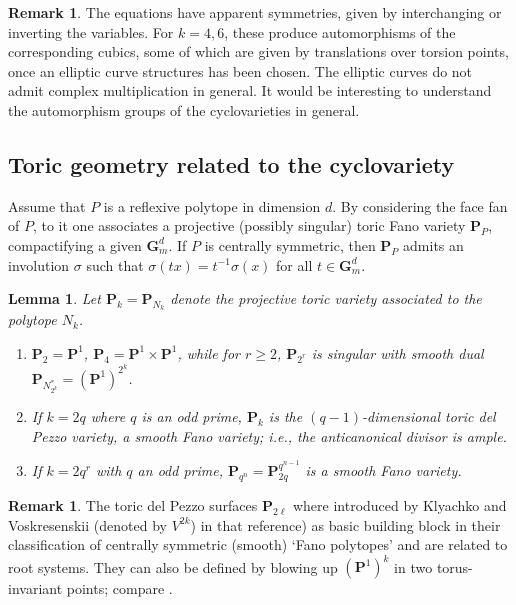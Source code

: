 \documentclass[12pt,reqno]{amsart}
\theoremstyle{definition}
\theoremstyle{plain}
\newtheorem{lemma}[theorem]{Lemma}
\theoremstyle{definition}
\newtheorem{remark}[theorem]{Remark}
\newcommand{\PP}{\mathbf{P}}
\newcommand{\Gm}{\mathbf{G}_m}
\renewcommand{\geq}{\geqslant}
\begin{document}
\begin{remark} The equations have apparent symmetries, given by interchanging or inverting the variables. For $k=4,6$, these produce automorphisms of the corresponding cubics, some of which are given by translations over torsion points, once an elliptic curve structures has been chosen. The elliptic curves do not admit complex multiplication in general. It would be interesting to understand the automorphism groups of the cyclovarieties in general. 
\end{remark}
 
\subsection{Toric geometry related to the cyclovariety} 

Assume that $P$ is a reflexive polytope in dimension $d$. By considering the face fan of $P$, to it one associates a projective (possibly singular) toric Fano variety $\PP_P$, compactifying a given $\Gm^d$. If $P$ is centrally symmetric, then $\PP_P$ admits an involution $\sigma$ such that $\sigma(tx)=t^{-1}\sigma(x)$ for all $t \in \Gm^d$. 

\begin{lemma} \label{dp} Let $\PP_k=\PP_{N_k}$ denote the projective toric variety associated to the polytope $N_k$. 
\begin{enumerate}
\item  \label{dp1} $\PP_2=\PP^1$, $\PP_4 = \PP^1 \times \PP^1$, while for $r \geq 2$, $\PP_{2^r}$ is singular with smooth dual $\PP_{N^*_{2^k}} = (\PP^1)^{2^k}$.
\item \label{dp2} If $k=2q$ where $q$ is an odd prime, $\PP_{k}$ is the $(q-1)$-dimensional \emph{toric del Pezzo variety}, a smooth Fano variety; i.e., the anticanonical divisor is ample. 
\item \label{dp3} If $k=2q^r$ with $q$ an odd prime, $\PP_{q^n} = \PP_{2q}^{q^{n-1}}$ is a smooth Fano variety. 
\end{enumerate}
\end{lemma} 

\begin{remark} 
The toric del Pezzo surfaces $\PP_{2\ell}$ where introduced by Klyachko and Voskresenskii \cite{KlyachkoVoskresenskii} (denoted by $V^{2k}$) in that reference) as basic building block in their classification of centrally symmetric (smooth) `Fano polytopes' and are related to root systems. They can also be defined by blowing up $(\PP^1)^k$ in two torus-invariant points; compare \cite[VII.8.6]{Ewaldbook}. 
\end{remark}
\end{document}
